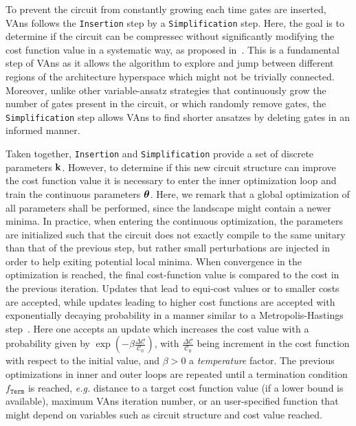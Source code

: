 To prevent the circuit from constantly growing each time gates are inserted, VAns follows the \texttt{Insertion} step by a \texttt{Simplification} step. Here, the goal is to determine if the circuit can be compressec without significantly modifying the cost function value in a systematic way, as proposed in~\cite{maslov2008quantum}. This is a fundamental step of VAns as it allows the algorithm to explore and jump between different regions of the architecture hyperspace which might not be trivially connected. Moreover, unlike other variable-ansatz strategies that continuously grow the number of gates present in the circuit, or which randomly remove gates, the \texttt{Simplification} step allows VAns to find shorter ansatzes by deleting gates in an informed manner.

Taken together, \texttt{Insertion} and \texttt{Simplification} provide a set of discrete parameters $\mathbf{k}$. However, to determine if this new circuit structure can improve the cost function value it is necessary to enter the inner optimization loop and train the continuous parameters $\bm{\theta}$. Here, we remark that a global optimization of all parameters shall be performed, since the landscape might contain a newer minima. In practice, when entering the continuous optimization, the parameters are initialized such that the circuit does not exactly compile to the same unitary than that of the previous step, but rather small perturbations are injected in order to help exiting potential local minima. When convergence in the optimization is reached, the final cost-function value is compared to the cost in the previous iteration. Updates that lead to equi-cost values or to smaller costs are accepted, while updates leading to higher cost functions are accepted with exponentially decaying probability in a manner similar to a Metropolis-Hastings step~\cite{hastings1970monte}. Here one accepts an update which increases the cost value with a probability given by $\exp{( -  \beta \frac{\Delta \mathcal{C}}{\mathcal{C}_0} )}$, with $\frac{\Delta \mathcal{C}}{\mathcal{C}_0}$ being increment in the cost function with respect to the initial value, and $\beta > 0$ a  \textit{temperature} factor.
The previous optimizations in inner and outer loops are repeated until a termination condition $f_\texttt{Term}$ is reached, \textit{e.g.} distance to a target cost function value (if a lower bound is available), maximum VAns iteration number, or an user-specified function that might depend on variables such as circuit structure and cost value reached.

